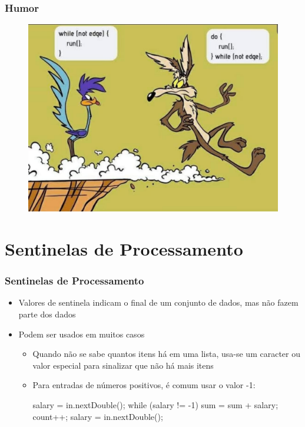 \documentclass[xcolor={dvipsnames,table},aspectratio=169]{beamer}
\begin{document}
\begin{frame}
\begin{columns}[T]
\begin{column}{0.5\linewidth}
\begin{center}
\begin{figure}[h]
\end{figure}
\end{center}
	\end{column}
\end{columns}

\end{frame}

\begin{frame}\frametitle{Humor}
\begin{figure}[h]
	\includegraphics[height=0.7\paperheight,center]{pucrs-ep-fprog-unidade_04-lacos-laminas-while_vs_do_while.jpg}
\end{figure}
\end{frame}

\section{Sentinelas de Processamento}

\begin{frame}[fragile]\frametitle{Sentinelas de Processamento}
\begin{itemize}
	\item Valores de sentinela indicam o final de um conjunto de dados, mas não fazem parte dos dados
	\item Podem ser usados em muitos casos
	\begin{itemize}
		\item Quando não se sabe quantos itens há em uma lista, usa-se um caracter ou valor especial para sinalizar que não há mais itens
		\item Para entradas de números positivos, é comum usar o valor -1:
\begin{javacode}
salary = in.nextDouble();
while (salary != -1) {
   sum = sum + salary;
   count++;
   salary = in.nextDouble();
}
\end{javacode}
	\end{itemize}
\end{itemize}
\end{frame}
\end{document}
